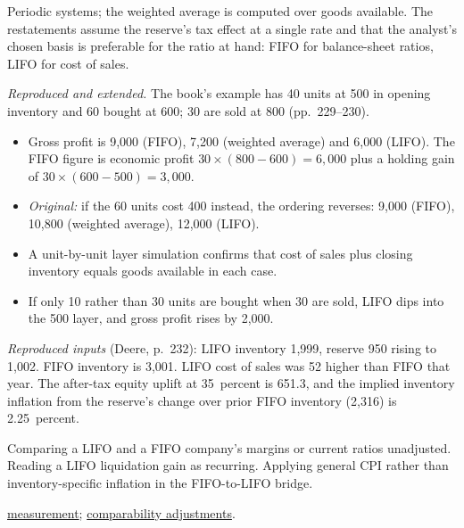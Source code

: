 \begin{qfmethod}
 Periodic systems; the weighted average is computed over goods available. The restatements assume the reserve's tax effect at a single rate and that the analyst's chosen basis is preferable for the ratio at hand: FIFO for balance-sheet ratios, LIFO for cost of sales.

 \emph{Reproduced and extended.} The book's example has 40 units at 500 in opening inventory and 60 bought at 600; 30 are sold at 800 (pp.~229--230).
\begin{itemize}
\item Gross profit is 9{,}000 (FIFO), 7{,}200 (weighted average) and 6{,}000 (LIFO). The FIFO figure is economic profit $30\times(800-600)=6{,}000$ plus a holding gain of $30\times(600-500)=3{,}000$.
\item \emph{Original:} if the 60 units cost 400 instead, the ordering reverses: 9{,}000 (FIFO), 10{,}800 (weighted average), 12{,}000 (LIFO).
\item A unit-by-unit layer simulation confirms that cost of sales plus closing inventory equals goods available in each case.
\item If only 10 rather than 30 units are bought when 30 are sold, LIFO dips into the 500 layer, and gross profit rises by 2{,}000.
\end{itemize}

\emph{Reproduced inputs} (Deere, p.~232): LIFO inventory 1{,}999, reserve 950 rising to 1{,}002. FIFO inventory is 3{,}001. LIFO cost of sales was 52 higher than FIFO that year. The after-tax equity uplift at 35~percent is 651.3, and the implied inventory inflation from the reserve's change over prior FIFO inventory (2{,}316) is 2.25~percent.

 Comparing a LIFO and a FIFO company's margins or current ratios unadjusted. Reading a LIFO liquidation gain as recurring. Applying general CPI rather than inventory-specific inflation in the FIFO-to-LIFO bridge.

 \hyperref[meth:inventory-measurement-nrv]{measurement}; \hyperref[meth:accounting-analysis-adjustments]{comparability adjustments}.

\end{qfmethod}

